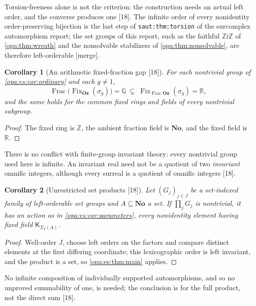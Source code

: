\documentclass[11pt,oneside]{article}
\numberwithin{equation}{section}
\newtheorem{corollary}[corollary]{Corollary}
\theoremstyle{definition}
\theoremstyle{remark}
\newcommand{\No}{\mathbf{No}}
\newcommand{\Oz}{\mathbf{Oz}}
\newcommand{\R}{\mathbb R}
\newcommand{\Q}{\mathbb Q}
\newcommand{\Z}{\mathbb Z}
\newcommand{\Fix}{\operatorname{Fix}}
\newcommand{\Frac}{\operatorname{Frac}}
\newcommand{\src}[1]{\textup{\textsf{\small[#1]}}}
\newcommand{\mergetag}{\textup{\textsf{\small[merge]}}}
\newcommand{\lbl}[1]{\nolinkurl{#1}}
\begin{document}
Torsion-freeness alone is not the criterion: the construction needs an actual left order, and the converse produces one \src{18}.
The infinite order of every nonidentity order-preserving bijection is the last step of \lbl{saut:thm:torsion} of the surcomplex
automorphism report; the set groups of this report, such as the faithful $\Z\wr\Z$ of \cref{opa:thm:wreath} and the nonsolvable
stabilizers of \cref{opa:thm:nonsolvable}, are therefore left-orderable \mergetag.

\begin{corollary}[An arithmetic fixed-fraction gap \src{18}]\label{opa:es:cor:fractiongap}
For each nontrivial group of \cref{opa:es:cor:ordinary} and each $g\ne1$,
\begin{equation}\label{opa:es:eq:gap}
 \Frac\bigl(\Fix_{\Oz}(\sigma_g)\bigr)=\Q\ \subsetneq\ \Fix_{\Frac\Oz}(\sigma_g)=\R,
\end{equation}
and the same holds for the common fixed rings and fields of every nontrivial subgroup.
\end{corollary}
\begin{proof}
The fixed ring is $\Z$, the ambient fraction field is $\No$, and the fixed field is $\R$.
\end{proof}

There is no conflict with finite-group invariant theory: every nontrivial group used here is infinite. An invariant real need not be a
quotient of two \emph{invariant} omnific integers, although every surreal is a quotient of omnific integers \src{18}.

\begin{corollary}[Unrestricted set products \src{18}]\label{opa:es:cor:products}
Let $(G_j)_{j\in J}$ be a set-indexed family of left-orderable set groups and $A\subseteq\No$ a set. If $\prod_jG_j$ is nontrivial, it has an
action as in \cref{opa:es:cor:parameters}, every nonidentity element having fixed field $\mathsf K_{\Sigma_2(A)}$.
\end{corollary}
\begin{proof}
Well-order $J$, choose left orders on the factors and compare distinct elements at the first differing coordinate; this lexicographic
order is left invariant, and the product is a set, so \cref{opa:es:thm:main} applies.
\end{proof}

No infinite composition of individually supported automorphisms, and so no unproved summability of one, is needed; the conclusion is
for the full product, not the direct sum \src{18}.
\end{document}
